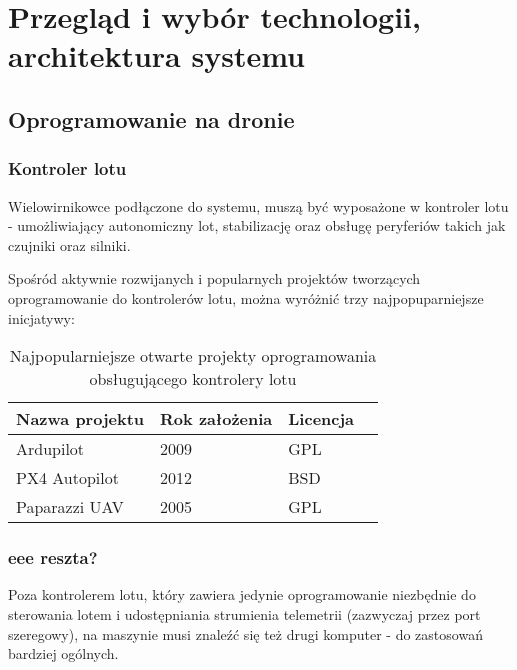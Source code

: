 \chapter{Przegląd i wybór technologii, architektura systemu}

\section{Oprogramowanie na dronie}

\subsection{Kontroler lotu}

Wielowirnikowce podłączone do systemu, muszą być
wyposażone w kontroler lotu - umożliwiający
autonomiczny lot, stabilizację oraz obsługę 
peryferiów takich jak czujniki oraz silniki.

Spośród aktywnie rozwijanych i popularnych
projektów tworzących oprogramowanie do kontrolerów
lotu, można wyróżnić trzy najpopuparniejsze inicjatywy: \\

\begin{table}[htb]
	\centering\small
	\caption{Najpopularniejsze otwarte projekty oprogramowania obsługującego kontrolery lotu}
	\label{tab}

	\begin{tabular}{|l|l|l|l|}
		\hline 
		\textbf{Nazwa projektu}						& \textbf{Rok założenia} &  \textbf{Licencja} \\ \hline
		Ardupilot\cite{ardupilot_home_page}			&     2009				 & GPL     \\ \hline
		PX4 Autopilot\cite{px4_home_page}						&     2012				 & BSD    \\ \hline
		Paparazzi UAV\cite{paparazzi_home_page}		&     2005				 & GPL \\ \hline    
	\end{tabular}
\end{table}


\subsection{eee reszta?}

Poza kontrolerem lotu, który zawiera jedynie oprogramowanie 
niezbędnie do sterowania lotem i udostępniania
strumienia telemetrii (zazwyczaj przez port szeregowy),
na maszynie musi znaleźć się też drugi komputer - 
do zastosowań bardziej ogólnych.

